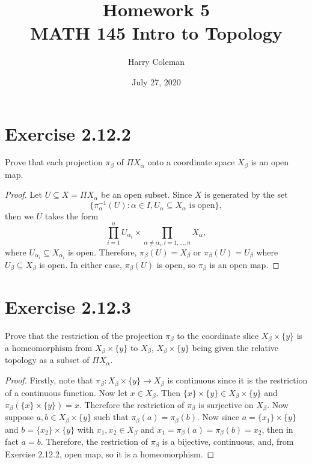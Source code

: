 \documentclass[12pt]{article}
\newenvironment{problem}
    {\begin{lrbox}{\mybox}\begin{minipage}{\textwidth-10pt}}
    {\end{minipage}\end{lrbox}\framebox[6.5in]{\usebox{\mybox}}}
\begin{document}
 
\title{Homework 5\\
    \large MATH 145 Intro to Topology
}
\author{Harry Coleman}
\date{July 27, 2020}
\maketitle

\section*{Exercise 2.12.2}
\begin{problem}
    Prove that each projection $\pi_\beta$ of $\Pi X_\alpha$ onto a coordinate space $X_\beta$ is an open map.
\end{problem}

\begin{proof}
    Let $U\subseteq X = \Pi X_\alpha$ be an open subset. Since $X$ is generated by the set
    \[\{\pi_\alpha^{-1}(U) : \alpha\in I, U_\alpha\subseteq X_\alpha \text{ is open}\},\]
    then we $U$ takes the form
    \[\prod_{i=1}^n U_{\alpha_i} \times \prod_{\alpha\ne\alpha_i, i=1,\dots,n}X_\alpha,\]
    where $U_{\alpha_i}\subseteq X_{\alpha_i}$ is open. Therefore, $\pi_\beta(U) = X_\beta$ or $\pi_\beta(U)=U_\beta$ where $U_\beta\subseteq X_\beta$ is open. In either case, $\pi_\beta(U)$ is open, so $\pi_\beta$ is an open map.
\end{proof}

\section*{Exercise 2.12.3}
\begin{problem}
    Prove that the restriction of the projection $\pi_\beta$ to the coordinate slice $X_\beta \times \{y\}$ is a homeomorphism from $X_\beta \times \{y\}$ to $X_\beta$, $X_\beta\times\{y\}$ being given the relative topology as a subset of $\Pi X_\alpha$. 
\end{problem}

\begin{proof}
    Firstly, note that $\pi_\beta : X_\beta\times\{y\} \to X_\beta$ is continuous since it is the restriction of a continuous function. Now let $x\in X_\beta$. Then $\{x\}\times\{y\}\in X_\beta\times\{y\}$ and $\pi_\beta(\{x\}\times\{y\}) = x$. Therefore the restriction of $\pi_\beta$ is surjective on $X_\beta$. Now suppose $a,b\in X_\beta\times\{y\}$ such that $\pi_\beta(a)=\pi_\beta(b)$. Now since $a=\{x_1\}\times\{y\}$ and $b=\{x_2\}\times\{y\}$ with $x_1,x_2\in X_\beta$ and $x_1=\pi_\beta(a)=\pi_\beta(b)=x_2$, then in fact $a=b$. Therefore, the restriction of $\pi_\beta$ is a bijective, continuous, and, from Exercise 2.12.2, open map, so it is a homeomorphism.
    
\end{proof}
\end{document}
